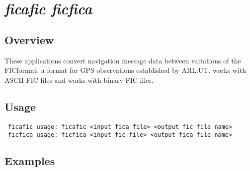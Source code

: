 %
%

\section{\emph{ficafic ficfica}}
\subsection{Overview}
These applications convert navigation message data between variations of the FICformat, a format for GPS observations established by ARL:UT.
 works with ASCII FIC files and  works with binary FIC files.

\subsection{Usage}
\begin{\outputsize}
\begin{verbatim}
 ficafic usage: ficafic <input fica file> <output fic file name>
 ficfica usage: ficfica <input fic file> <output fica file name>
\end{verbatim}
\end{\outputsize}

\subsection{Examples}

